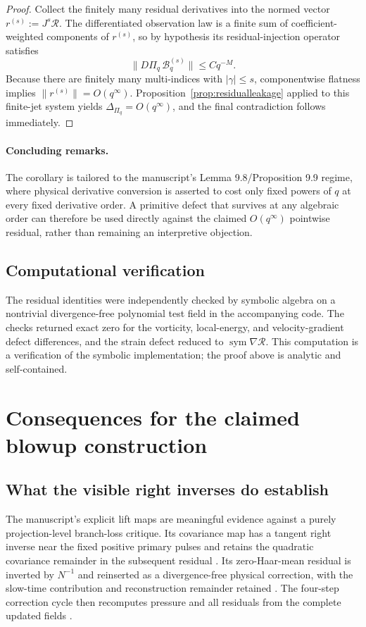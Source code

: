 \documentclass[12pt]{article}
\newcommand{\Rres}{\mathcal R}
\newcommand{\sym}{\operatorname{sym}}
\begin{document}
\begin{proof}
Collect the finitely many residual derivatives into the normed vector $r^{(s)}:=J^s\Rres$. The differentiated observation law is a finite sum of coefficient-weighted components of $r^{(s)}$, so by hypothesis its residual-injection operator satisfies
\[
\|D\Pi_q\,\mathcal B^{(s)}_q\|\le Cq^{-M}.
\]
Because there are finitely many multi-indices with $|\gamma|\le s$, componentwise flatness implies $\|r^{(s)}\|=O(q^\infty)$. Proposition~\ref{prop:residualleakage} applied to this finite-jet system yields $\Delta_{\Pi_q}=O(q^\infty)$, and the final contradiction follows immediately.
\end{proof}

\paragraph{Concluding remarks.}
The corollary is tailored to the manuscript's Lemma 9.8/Proposition 9.9 regime, where physical derivative conversion is asserted to cost only fixed powers of $q$ at every fixed derivative order. A primitive defect that survives at any algebraic order can therefore be used directly against the claimed $O(q^\infty)$ pointwise residual, rather than remaining an interpretive objection.

\subsection{Computational verification}

The residual identities were independently checked by symbolic algebra on a nontrivial divergence-free polynomial test field in the accompanying code. The checks returned exact zero for the vorticity, local-energy, and velocity-gradient defect differences, and the strain defect reduced to $\sym\nabla\Rres$. This computation is a verification of the symbolic implementation; the proof above is analytic and self-contained.


\section{Consequences for the claimed blowup construction}
\subsection{What the visible right inverses do establish}
The manuscript's explicit lift maps are meaningful evidence against a purely projection-level branch-loss critique. Its covariance map has a tangent right inverse near the fixed positive primary pulses and retains the quadratic covariance remainder in the subsequent residual \cite[pp. 82--87]{OpenAI2026}. Its zero-Haar-mean residual is inverted by $N^{-1}$ and reinserted as a divergence-free physical correction, with the slow-time contribution and reconstruction remainder retained \cite[pp. 95--96]{OpenAI2026}. The four-step correction cycle then recomputes pressure and all residuals from the complete updated fields \cite[pp. 106--111]{OpenAI2026}.
\end{document}
